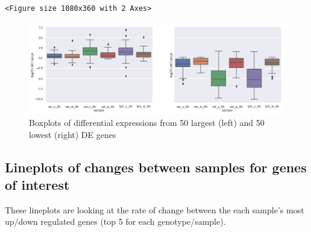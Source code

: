 \documentclass[11pt]{article}
\begin{document}
\begin{verbatim}
<Figure size 1080x360 with 2 Axes>
\end{verbatim}


\begin{figure}[htbp]
\centering
\includegraphics[width=.9\linewidth]{obipy-resources/pairings_timingsr_boxplots.png}
\caption{\label{pairings_timings_boxplots}
Boxplots of differential expressions from 50 largest (left) and 50 lowest (right) DE genes}
\end{figure}

\subsection{Lineplots of changes between samples for genes of interest}
\label{sec:org75ff674}

These lineplots are looking at the rate of change between the each sample's most up/down regulated genes (top 5 for each genotype/sample).\\
\end{document}
